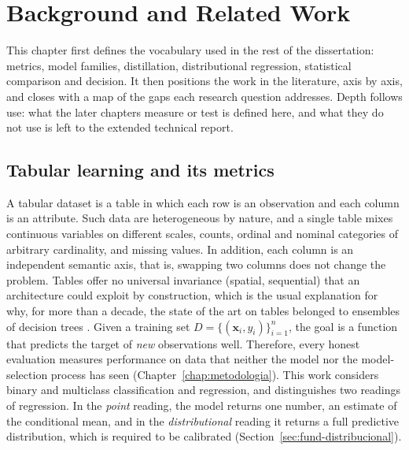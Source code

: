\chapter{Background and Related Work}
\label{chap:fundamentacao}

This chapter first defines the vocabulary used in the rest of the dissertation: metrics, model families, distillation, distributional regression, statistical comparison and decision. It then positions the work in the literature, axis by axis, and closes with a map of the gaps each research question addresses. Depth follows use: what the later chapters measure or test is defined here, and what they do not use is left to the extended technical report.

\section{Tabular learning and its metrics}
\label{sec:fund-tabular}
\label{sec:fund-metricas-clf}

A tabular dataset is a table in which each row is an observation and
each column is an attribute. Such data are heterogeneous by nature, and a single table mixes continuous variables on
different scales, counts, ordinal and nominal categories of arbitrary
cardinality, and missing values. In addition, each column is an
independent semantic axis, that is, swapping two columns does not
change the problem. Tables offer no universal invariance (spatial, sequential) that an architecture could exploit by construction, which is the usual explanation for why, for more than a
decade, the state of the art on tables belonged to ensembles of
decision trees \citep{grinsztajn2022}. Given a training set
$D = \{(\mathbf{x}_i, y_i)\}_{i=1}^{n}$, the goal is a function that
predicts the target of \emph{new} observations well. Therefore, every
honest evaluation measures performance on data that neither the model
nor the model-selection process has seen
(Chapter~\ref{chap:metodologia}). This work considers binary and multiclass classification and regression, and distinguishes two readings of regression. In the \emph{point} reading, the model returns one number, an estimate of the conditional mean, and in the \emph{distributional} reading it returns a full predictive distribution, which is required to be calibrated (Section~\ref{sec:fund-distribucional}).

